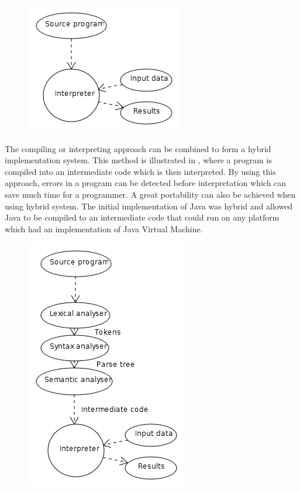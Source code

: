 \begin{figure}
\centering
\includegraphics[scale=0.5]{pictures/compileroverviewinterpretation.png}
\label{fig:compileroverviewinterpretation}
\end{figure}

The compiling or interpreting approach can be combined to form a hybrid implementation system. This method is illustrated in , where a program is compiled into an intermediate code which is then interpreted. By using this approach, errors in a program can be detected before interpretation which can save much time for a programmer. A great portability can also be achieved when using hybrid system. The initial implementation of Java was hybrid and allowed Java to be compiled to an intermediate code that could run on any platform which had an implementation of Java Virtual Machine\cite[p. 50]{sebesta2013}. 

\begin{figure}
\centering
\includegraphics[scale=0.5]{pictures/compileroverviewhybrid.png}
\label{fig:compileroverviewhybrid}
\end{figure}